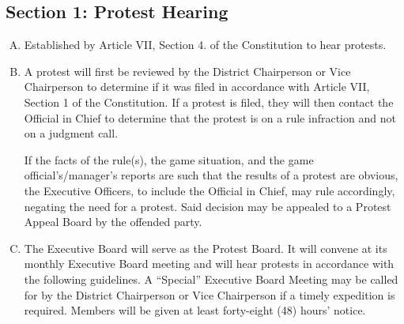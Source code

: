 \documentclass[letteraper,10pt,oneside,draft]{memoir}
\begin{document}
\subsection{Section 1: Protest Hearing}
\begin{enumerate}[A.]
    \item Established by Article VII, Section 4. of the Constitution to hear protests.
    \item A protest will first be reviewed by the District Chairperson or Vice Chairperson to determine if it was filed in accordance with Article VII, Section 1 of the Constitution.  If a protest is filed, they will then contact the Official in Chief to determine that the protest is on a rule infraction and not on a judgment call.
    
    If the facts of the rule(s), the game situation, and the game official’s/manager’s reports are such that the results of a protest are obvious, the Executive Officers, to include the Official in Chief, may rule accordingly, negating the need for a protest.  Said decision may be appealed to a Protest Appeal Board by the offended party.
    \item The Executive Board will serve as the Protest Board. It will convene at its monthly Executive Board meeting and will hear protests in accordance with the following guidelines. A “Special” Executive Board Meeting may be called for by the District Chairperson or Vice Chairperson if a timely expedition is required. Members will be given at least forty-eight (48) hours’ notice.
\end{enumerate}
\end{document}
